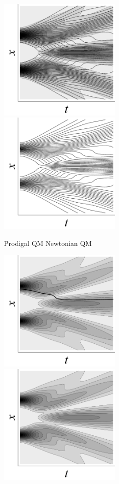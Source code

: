 \documentclass[onecolumn,secnumarabic,balancelastpage,amsmath,amssymb,nofootinbib]{article}
\begin{document}
\begin{figure}[h!]
\centerline{\includegraphics[width=6cm]{ProdigalQMBlackandWhite.jpg}\ \ \ \ \ \ \includegraphics[width=6cm]{NewtonianQMBlackandWhite.jpg}}
\vspace*{-4 pt}
\large{\hspace*{3 cm} Prodigal QM \hspace{3.9 cm} Newtonian QM}\vspace*{8 pt}\\
\centerline{\includegraphics[width=6cm]{BohmianQMBlackandWhite.jpg}\ \ \ \ \ \ \includegraphics[width=6cm]{EverettianQMBlackandWhite.jpg}}\vspace*{-4 pt}

\end{figure}
\end{document}
